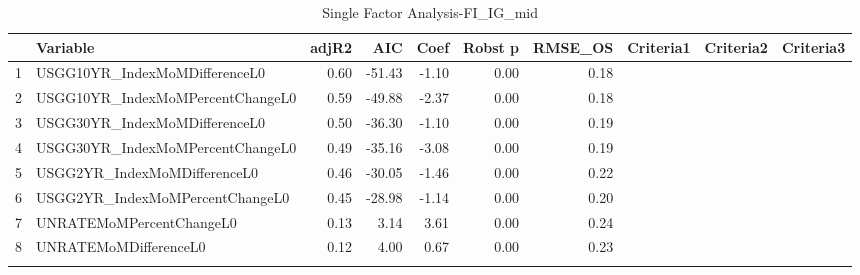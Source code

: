 \begin{longtable}{rlrrrrrlll}
  \hline
 & Variable & adjR2 & AIC & Coef & Robst p & RMSE\_OS & Criteria1 & Criteria2 & Criteria3 \\ 
  \hline
1 & USGG10YR\_IndexMoMDifferenceL0 & 0.60 & -51.43 & -1.10 & 0.00 & 0.18 &  &  &  \\ 
  2 & USGG10YR\_IndexMoMPercentChangeL0 & 0.59 & -49.88 & -2.37 & 0.00 & 0.18 &  &  &  \\ 
  3 & USGG30YR\_IndexMoMDifferenceL0 & 0.50 & -36.30 & -1.10 & 0.00 & 0.19 &  &  &  \\ 
  4 & USGG30YR\_IndexMoMPercentChangeL0 & 0.49 & -35.16 & -3.08 & 0.00 & 0.19 &  &  &  \\ 
  5 & USGG2YR\_IndexMoMDifferenceL0 & 0.46 & -30.05 & -1.46 & 0.00 & 0.22 &  &  &  \\ 
  6 & USGG2YR\_IndexMoMPercentChangeL0 & 0.45 & -28.98 & -1.14 & 0.00 & 0.20 &  &  &  \\ 
  7 & UNRATEMoMPercentChangeL0 & 0.13 & 3.14 & 3.61 & 0.00 & 0.24 &  &  &  \\ 
  8 & UNRATEMoMDifferenceL0 & 0.12 & 4.00 & 0.67 & 0.00 & 0.23 &  &  &  \\ 
   \hline
\hline
\caption{Single Factor Analysis-FI_IG_mid} 
\end{longtable}
